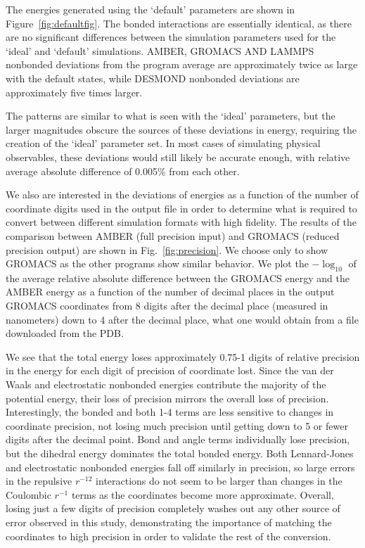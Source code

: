 The energies generated using the `default' parameters are shown in
Figure~\ref{fig:defaultfig}. The bonded interactions are essentially
identical, as there are no significant differences between the
simulation parameters used for the `ideal' and `default'
simulations. AMBER, GROMACS AND LAMMPS nonbonded deviations from the
program average are approximately twice as large with the default
states, while DESMOND nonbonded deviations are approximately five
times larger.  

The patterns are similar to what is seen with the `ideal' parameters,
but the larger magnitudes obscure the sources of these deviations in
energy, requiring the creation of the `ideal' parameter set. In most
cases of simulating physical observables, these deviations would still
likely be accurate enough, with relative average absolute difference
of 0.005\% from each other. 


We also are interested in the deviations of energies as a function of
the number of coordinate digits used in the output file in order to
determine what is required to convert between different simulation formats 
with high fidelity. The results of the comparison between AMBER 
(full precision input) and GROMACS
(reduced precision output) are shown in Fig.~\ref{fig:precision}.  We
choose only to show GROMACS as the other programs show similar
behavior. We plot the $-\log_{10}$ of the average relative absolute
difference between the GROMACS energy and the AMBER energy as a
function of the number of decimal places in the output GROMACS
coordinates from 8 digits after the decimal place (measured in
nanometers) down to 4 after the decimal place, what one would obtain
from a file downloaded from the PDB.

We see that the total energy loses approximately 0.75-1 digits of
relative precision in the energy for each digit of precision of
coordinate lost. Since the van der Waals and electrostatic nonbonded
energies contribute the majority of the potential energy, their loss
of precision mirrors the overall loss of precision. Interestingly, the
bonded and both 1-4 terms are less sensitive to changes in coordinate
precision, not losing much precision until getting down to 5 or fewer
digits after the decimal point. Bond and angle terms individually lose
precision, but the dihedral energy dominates the total bonded energy.
Both Lennard-Jones and electrostatic nonbonded energies fall off
similarly in precision, so large errors in the repulsive $r^{-12}$
interactions do not seem to be larger than changes in the Coulombic
$r^{-1}$ terms as the coordinates become more approximate.
Overall, losing just a few digits of precision completely washes out
any other source of error observed in this study, demonstrating the
importance of matching the coordinates to high precision in order to
validate the rest of the conversion.

